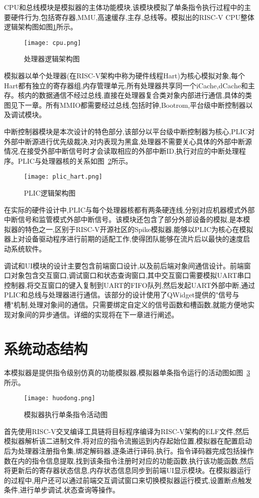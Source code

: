 CPU和总线模块是模拟器的主体功能模块,该模块模拟了单条指令执行过程中的主要硬件行为,包括寄存器,MMU,高速缓存,主存,总线等。模拟出的RISC-V CPU整体逻辑架构图如图\ref{fig:cpu}所示。
\begin{figure}[H]
  \centering
  \texttt{[image: cpu.png]}
  \caption{处理器逻辑架构图}
  \label{fig:cpu}
\end{figure}
模拟器以单个处理器(在RISC-V架构中称为硬件线程Hart)为核心模拟对象,每个Hart都有独立的寄存器组,内存管理单元,所有处理器共享同一个iCache,dCache和主存。核内的数据通信不经过总线,直接在处理器复合类对象内部进行通信,具体的类图见下一章。所有MMIO都需要经过总线,包括时钟,Bootrom,平台级中断控制器以及调试模块。


中断控制器模块是本次设计的特色部分,该部分以平台级中断控制器为核心,PLIC对外部中断源进行优先级裁决,对内表现为黑盒,处理器不需要关心具体的外部中断源情况,在接受外部中断信号时才会读取相应的外部中断ID,执行对应的中断处理程序。PLIC与处理器核的关系如图~\ref{fig:plic-to-hart}所示。
\begin{figure}[H]
  \centering
  \texttt{[image: plic\_hart.png]}
  \caption{PLIC逻辑架构图}
  \label{fig:plic-to-hart}
\end{figure}
在实际的硬件设计中,PLIC与每个处理器核都有两条硬连线,分别对应机器模式外部中断信号和监管模式外部中断信号。该模块还包含了部分外部设备的模拟,是本模拟器的特色之一,区别于RISC-V开源社区的Spike模拟器,能够以PLIC为核心在模拟器上对设备驱动程序进行前期的适配工作,使得团队能够在流片后以最快的速度启动系统软件。


调试和UI模块的设计主要包含前端窗口设计,以及前后端对象间通信设计。前端窗口对象包含交互窗口,调试窗口和状态查询窗口,其中交互窗口需要模拟UART串口控制器,将交互窗口的键入复制到UART的FIFO队列,然后发起UART外部中断,通过PLIC和总线与处理器进行通信。该部分的设计使用了QWidget提供的"信号与槽"机制,处理对象间的通信。只需要绑定自定义的信号函数和槽函数,就能方便地实现对象间的异步通信。详细的实现将在下一章进行阐述。

\section{系统动态结构}
本模拟器是提供指令级别仿真的功能模拟器,模拟器单条指令运行的活动图如图~\ref{fig:sim-seq1}所示。
\begin{figure}[H]
  \centering
  \texttt{[image: huodong.png]}
  \caption{模拟器执行单条指令活动图}
  \label{fig:sim-seq1}
\end{figure}


首先使用RISC-V交叉编译工具链将目标程序编译为RISC-V架构的ELF文件,然后模拟器解析该二进制文件,将对应的指令流搬运到内存起始位置,模拟器在配置启动后为处理器注册指令集,绑定解码器,逐条进行译码,执行。指令译码器完成包括操作数在内的指令信息提取,找到该条指令注册时对应的功能函数,执行该功能函数,然后将更新后的寄存器状态信息,内存状态信息同步到前端UI显示模块。在模拟器运行的过程中,用户还可以通过前端交互调试窗口来切换模拟器运行模式,设置断点触发条件,进行单步调试,状态查询等操作。


